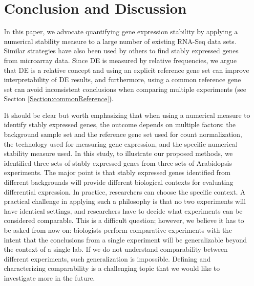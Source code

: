 \documentclass[letterpaper,12pt]{article}
\begin{document}
  \section{Conclusion and Discussion}\label{section:discussion}
  
In this paper, we advocate quantifying gene expression stability by applying a
numerical stability measure to a large number of existing RNA-Seq data sets.
Similar strategies have also been used by others to find stably expressed
genes from microarray data. Since DE is measured by relative frequencies, we
argue that DE is a relative concept and using an explicit reference gene set
can improve interpretability of DE results, and furthermore,  using a common
reference gene set can avoid inconsistent conclusions when comparing multiple
experiments (see Section \ref{Section:commonReference}).



It should be clear but worth emphasizing that when using a numerical measure
to identify stably expressed genes, the outcome depends on multiple factors:
the background sample set and the reference gene set used for count
normalization, the technology used
for measuring gene expression, and the specific numerical stability measure
used.  In this study, to illustrate our proposed methods, we identified three
sets of stably expressed genes from three sets of Arabidopsis experiments. The
major point is that stably expressed genes identified from different
backgrounds will provide different biological contexts for evaluating
differential expression. In practice, researchers can choose the specific
context. A practical challenge in applying such a philosophy is that no two
experiments will have identical settings, and researchers have to decide what
experiments can be considered comparable. This is a difficult question;
however, we believe it has to be asked from now on: biologists perform
comparative experiments with the intent that the conclusions from a single
experiment will be generalizable beyond the context of a single lab. If we do
not understand comparability between different experiments, such
generalization is impossible. Defining and characterizing comparability is a
challenging topic that we would like to investigate more in the future.
\end{document}
